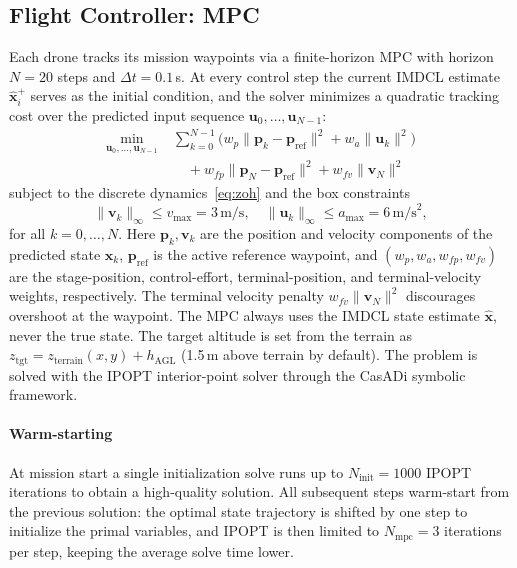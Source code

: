 \documentclass[journal,10pt,twocolumn]{IEEEtran}
\begin{document}
\subsection{Flight Controller: MPC}
\label{sec:mpc}

Each drone tracks its mission waypoints via a finite-horizon MPC with
horizon $N = 20$ steps and $\Delta t = 0.1$\,s.  At every control step
the current IMDCL estimate $\hat{\mathbf{x}}^+_i$ serves as the initial
condition, and the solver minimizes a quadratic tracking cost over the
predicted input sequence $\mathbf{u}_0, \ldots, \mathbf{u}_{N-1}$:
\begin{equation}
  \begin{aligned}
  \min_{\mathbf{u}_0, \ldots, \mathbf{u}_{N-1}}\;
  &\sum_{k=0}^{N-1} \Big( w_p \|\mathbf{p}_k - \mathbf{p}_{\text{ref}}\|^2
    + w_a \|\mathbf{u}_k\|^2 \Big) \\
  &\quad + w_{fp} \|\mathbf{p}_N - \mathbf{p}_{\text{ref}}\|^2
    + w_{fv} \|\mathbf{v}_N\|^2
  \end{aligned}
  \label{eq:mpc_cost}
\end{equation}
subject to the discrete dynamics~\eqref{eq:zoh} and the box constraints
\begin{equation}
  \|\mathbf{v}_k\|_\infty \leq v_{\max} = 3\,\text{m/s},\quad
  \|\mathbf{u}_k\|_\infty \leq a_{\max} = 6\,\text{m/s}^2,
  \label{eq:mpc_constraints}
\end{equation}
for all $k = 0, \ldots, N$.  Here $\mathbf{p}_k, \mathbf{v}_k$ are the
position and velocity components of the predicted state
$\mathbf{x}_k$, $\mathbf{p}_{\text{ref}}$ is the active reference
waypoint, and $(w_p, w_a, w_{fp}, w_{fv})$ are the stage-position,
control-effort, terminal-position, and terminal-velocity weights,
respectively.  The terminal velocity penalty $w_{fv}\|\mathbf{v}_N\|^2$
discourages overshoot at the waypoint.
The MPC always uses the IMDCL state estimate $\hat{\mathbf{x}}$,
never the true state.
The target altitude is set from the terrain as
$z_{\text{tgt}} = z_{\text{terrain}}(x, y) + h_{\text{AGL}}$ (1.5\,m above terrain by default).
The problem is solved with the IPOPT interior-point solver through the
CasADi symbolic framework.

\paragraph{Warm-starting}
At mission start a single initialization solve runs up to
$N_{\text{init}} = 1000$ IPOPT iterations to obtain a high-quality solution.  All subsequent steps warm-start from the
previous solution: the optimal state trajectory is shifted by one step
to initialize the primal variables, and IPOPT is then limited to
$N_{\text{mpc}} = 3$ iterations per step, keeping the average solve time lower.
\end{document}
